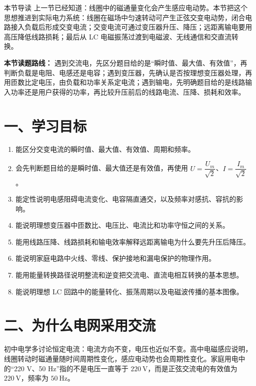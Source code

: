 
\begin{learningbox}{本节导读}
上一节已经知道：线圈中的磁通量变化会产生感应电动势。本节把这个思想推进到实际电力系统：线圈在磁场中匀速转动可产生正弦交变电动势，闭合电路接入负载后形成交变电流；交变电流可通过变压器升压、降压；远距离输电要用高压降低线路损耗；最后从 LC 电磁振荡过渡到电磁波、无线通信和交直流转换。
\end{learningbox}

\textbf{本节读题路线：} 遇到交流电，先区分题目给的是“瞬时值、最大值、有效值”，再判断负载是电阻、电感还是电容；遇到变压器，先确认是否按理想变压器处理，再用匝数比定电压，由负载和功率关系定电流；遇到输电，先明确题目给的是线路输入功率还是用户获得的功率，再比较升压前后的线路电流、压降、损耗和效率。

\section*{一、学习目标}
\begin{enumerate}
  \item 能区分交变电流的瞬时值、最大值、有效值、周期和频率。
  \item 会先判断题目给的是瞬时值、最大值还是有效值，再使用 $U=\dfrac{U_m}{\sqrt2}$、$I=\dfrac{I_m}{\sqrt2}$。
  \item 能定性说明电感阻碍电流变化、电容隔直通交，以及频率对感抗、容抗的影响。
  \item 能说明理想变压器中匝数比、电压比、电流比和功率守恒之间的关系。
  \item 能用线路压降、线路损耗和输电效率解释远距离输电为什么要先升压后降压。
  \item 能说明家庭电路中火线、零线、保护接地和漏电保护的物理作用。
  \item 能用能量转换路径说明整流和逆变把交流电、直流电相互转换的基本思想。
  \item 能说明理想 LC 回路中的能量转化、振荡周期以及电磁波传播的基本图像。
\end{enumerate}
\section*{二、为什么电网采用交流}

初中电学多讨论恒定电流：电流方向不变，电压也近似不变。高中电磁感应说明，线圈转动时磁通量随时间周期性变化，感应电动势也会周期性变化。家庭用电中的“220 V、50 Hz”指的不是电压一直等于 $220\ \mathrm{V}$，而是正弦交流电的有效值为 $220\ \mathrm{V}$，频率为 $50\ \mathrm{Hz}$。

